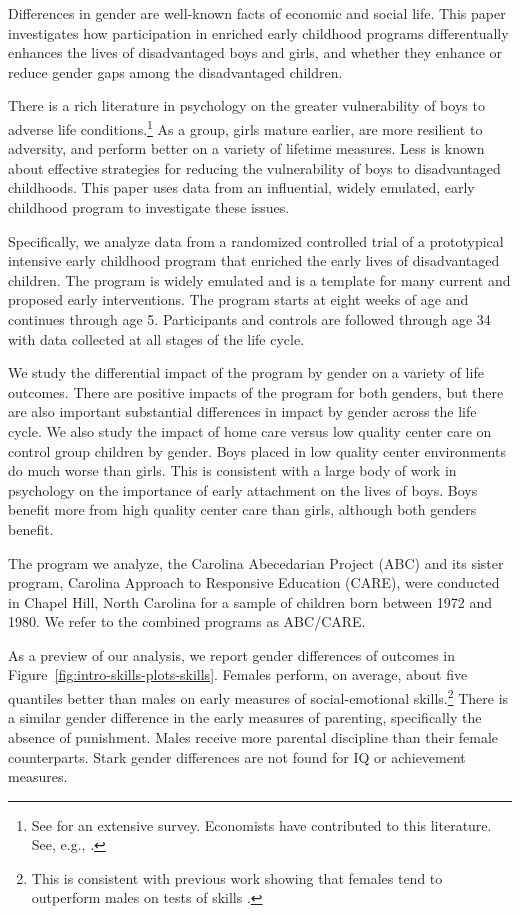 Differences in gender are well-known facts of economic and social life. This paper investigates how participation in enriched early childhood programs differentually enhances the lives of disadvantaged boys and girls, and whether they enhance or reduce gender gaps among the disadvantaged children.

There is a rich literature in psychology on the greater vulnerability of boys to adverse life conditions.\footnote{See \cite{Schore_2017_IMHJ} for an extensive survey. Economists have contributed to this literature. See, e.g., \cite{Autor-etal_2015_Family-Disadvantage}.} As a group, girls mature earlier, are more resilient to adversity, and perform better on a variety of lifetime measures. Less is known about effective strategies for reducing the vulnerability of boys to disadvantaged childhoods. This paper uses data from an influential, widely emulated, early childhood program to investigate these issues.

Specifically, we analyze data from a randomized controlled trial of a prototypical intensive early childhood program that enriched the early lives of disadvantaged children. The program is widely emulated and is a template for many current and proposed early interventions. The program starts at eight weeks of age and continues through age 5. Participants and controls are followed through age 34 with data collected at all stages of the life cycle.

We study the differential impact of the program by gender on a variety of life outcomes. There are positive impacts of the program for both genders, but there are also important substantial differences in impact by gender across the life cycle. We also study the impact of home care versus low quality center care on control group children by gender. Boys placed in low quality center environments do much worse than girls. This is consistent with a large body of work in psychology on the importance of early attachment on the lives of boys. Boys benefit more from high quality center care than girls, although both genders benefit.

The program we analyze, the Carolina Abecedarian Project (ABC) and its sister program, Carolina Approach to Responsive Education (CARE), were conducted in Chapel Hill, North Carolina for a sample of children born between 1972 and 1980. We refer to the combined programs as ABC/CARE.

As a preview of our analysis, we report gender differences of outcomes in Figure~\ref{fig:intro-skills-plots-skills}. Females perform, on average, about five quantiles better than males on early measures of social-emotional skills.\footnote{This is consistent with previous work showing that females tend to outperform males on tests of skills \citep{Baker-Milligan_2013_Boy-Girl-Differences}.} There is a similar gender difference in the early measures of parenting, specifically the absence of punishment. Males receive more parental discipline than their female counterparts. Stark gender differences are not found for IQ or achievement measures.

